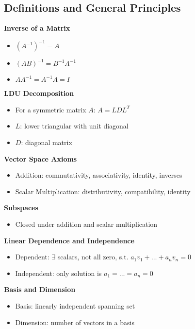 \documentclass[8pt, a4paper, landscape]{extarticle}
\begin{document}
\begin{multicols*}{5}

  \section*{Definitions and General Principles}

  \textbf{Inverse of a Matrix}
  \begin{itemize}
    \item $(A^{-1})^{-1} = A$
    \item $(AB)^{-1} = B^{-1}A^{-1}$
    \item $AA^{-1} = A^{-1}A = I$
  \end{itemize}

  \textbf{LDU Decomposition}
  \begin{itemize}
    \item For a symmetric matrix $A$: $A = LDL^T$
    \item $L$: lower triangular with unit diagonal
    \item $D$: diagonal matrix
  \end{itemize}

  \textbf{Vector Space Axioms}
  \begin{itemize}
    \item Addition: commutativity, associativity, identity, inverses
    \item Scalar Multiplication: distributivity, compatibility, identity
  \end{itemize}

  \textbf{Subspaces}
  \begin{itemize}
    \item Closed under addition and scalar multiplication
  \end{itemize}

  \textbf{Linear Dependence and Independence}
  \begin{itemize}
    \item Dependent: $\exists$ scalars, not all zero, s.t. $a_1v_1 + \ldots + a_nv_n = 0$
    \item Independent: only solution is $a_1 = \ldots = a_n = 0$
  \end{itemize}

  \textbf{Basis and Dimension}
  \begin{itemize}
    \item Basis: linearly independent spanning set
    \item Dimension: number of vectors in a basis
  \end{itemize}


\end{multicols*}
\end{document}
